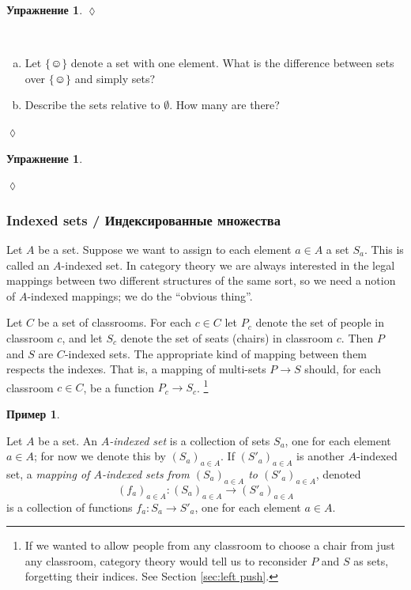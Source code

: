 \documentclass[a4paper]{book}
\def\singleton{\{\smiley\}}
\def\to{\rightarrow}
\def\taking{\colon}
\theoremstyle{myth}
\newtheorem{exampleENG}[envENG]{\begin{english}Example\end{english}}
\newtheorem{excENG}[envENG]{\begin{english}Exercise\end{english}}
\newtheorem{definitionENG}[envENG]{\begin{english}Definition\end{english}}
\newenvironment{exerciseENG}{\begin{excENG}}{\hspace*{\fill}$\lozenge$\end{excENG}}
\newtheorem{exampleRUS}[envRUS]{Пример}
\newtheorem{excRUS}[envRUS]{Упражнение}
\newenvironment{exerciseRUS}{\begin{excRUS}}{\hspace*{\fill}$\lozenge$\end{excRUS}}
\def\sexc{\begin{enumerate}[a.)]\setlength{\itemsep}{.1cm}\setlength{\parskip}{.1cm}\item}
\def\next{\item}
\def\endsexc{\end{enumerate}}
\begin{document}
\begin{russian}
\begin{exerciseRUS}
 
\end{exerciseRUS}

\begin{exerciseENG}~
\sexc Let $\singleton$ denote a set with one element. What is the difference between sets over $\singleton$ and simply sets?
\next Describe the sets relative to $\emptyset$. How many are there?
\endsexc
\end{exerciseENG}

\begin{exerciseRUS}~
 
\end{exerciseRUS}


\subsubsection{Indexed sets / Индексированные множества}\label{sec:indexed sets}

Let $A$ be a set. Suppose we want to assign to each element $a\in A$ a set $S_a$. This is called an $A$-indexed set. In category theory we are always interested in the legal mappings between two different structures of the same sort, so we need a notion of $A$-indexed mappings; we do the “obvious thing”.

 

\begin{exampleENG}\label{ex:classroom seats}
Let $C$ be a set of classrooms. For each $c\in C$ let $P_c$ denote the set of people in classroom $c$, and let $S_c$ denote the set of seats (chairs) in classroom $c$. Then $P$ and $S$ are $C$-indexed sets. The appropriate kind of mapping between them respects the indexes. That is, a mapping of multi-sets $P\to S$ should, for each classroom $c\in C$, be a function $P_c\to S_c$.%
\footnote{If we wanted to allow people from any classroom to choose a chair from just any classroom, category theory would tell us to reconsider $P$ and $S$ as sets, forgetting their indices. See Section \ref{sec:left push}.}
\end{exampleENG}

\begin{exampleRUS}\label{ex:classroom seats}
 
\end{exampleRUS}

\begin{definitionENG}\label{def:indexed sets}
Let $A$ be a set. An {\em $A$-indexed set} is a collection of sets $S_a$, one for each element $a\in A$; for now we denote this by $(S_a)_{a\in A}$. If $(S'_a)_{a\in A}$ is another $A$-indexed set, a {\em mapping of $A$-indexed sets from $(S_a)_{a\in A}$ to $(S'_a)_{a\in A}$}, denoted $$(f_a)_{a\in A}\taking(S_a)_{a\in A}\to (S'_a)_{a\in A}$$ is a collection of functions $f_a\taking S_a\to S'_a$, one for each element $a\in A$.
\end{definitionENG}


\end{russian}
\end{document}
